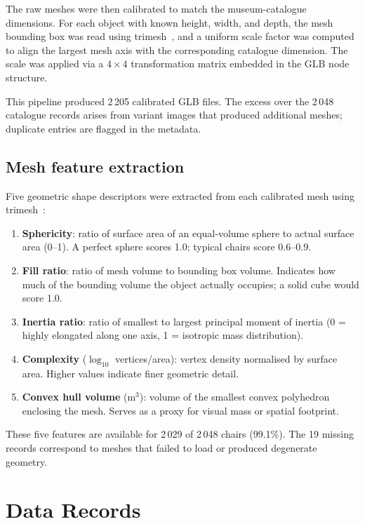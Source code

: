 The raw meshes were then calibrated to match the museum-catalogue dimensions.
For each object with known height, width, and depth,
the mesh bounding box was read using trimesh~\cite{trimesh},
and a uniform scale factor was computed to align the largest mesh axis
with the corresponding catalogue dimension.
The scale was applied via a $4 \times 4$ transformation matrix
embedded in the GLB node structure.

This pipeline produced 2\,205 calibrated GLB files.
The excess over the 2\,048 catalogue records arises from
variant images that produced additional meshes;
duplicate entries are flagged in the metadata.

\subsection{Mesh feature extraction}

Five geometric shape descriptors were extracted from each calibrated mesh
using trimesh~\cite{trimesh}:

\begin{enumerate}
\item \textbf{Sphericity}: ratio of surface area of an equal-volume sphere to actual surface area (0--1). A perfect sphere scores 1.0; typical chairs score 0.6--0.9.
\item \textbf{Fill ratio}: ratio of mesh volume to bounding box volume. Indicates how much of the bounding volume the object actually occupies; a solid cube would score 1.0.
\item \textbf{Inertia ratio}: ratio of smallest to largest principal moment of inertia (0 = highly elongated along one axis, 1 = isotropic mass distribution).
\item \textbf{Complexity} ($\log_{10}$ vertices/area): vertex density normalised by surface area. Higher values indicate finer geometric detail.
\item \textbf{Convex hull volume} (m$^3$): volume of the smallest convex polyhedron enclosing the mesh. Serves as a proxy for visual mass or spatial footprint.
\end{enumerate}

These five features are available for 2\,029 of 2\,048 chairs (99.1\%).
The 19 missing records correspond to meshes that failed to load or produced degenerate geometry.


\section{Data Records}

